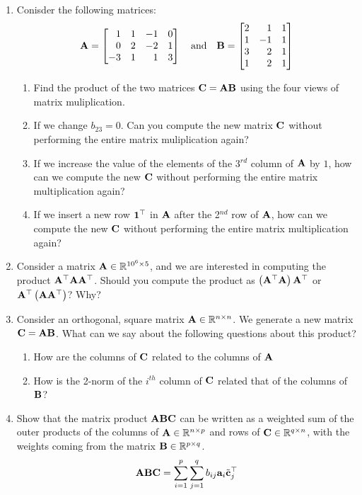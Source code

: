 \documentclass[
10pt, %
a4paper, %
oneside, %
headinclude,footinclude, %
BCOR5mm, %
]{scrartcl}
\def\mf{\ensuremath\mathbf}
\def\mb{\ensuremath\mathbb}
\def\lp{\ensuremath\left(}
\def\rp{\ensuremath\right)}
\def\bmx{\ensuremath\begin{bmatrix*}[r]}
\def\emx{\ensuremath\end{bmatrix*}}
\begin{document}
\begin{enumerate}
	\item Conisder the following matrices:
	\[ \mf{A} = \bmx 1 & 1 & -1 & 0 \\
	0 & 2 & -2 & 1 \\
	-3 & 1 & 1 & 3
	\emx \quad \text{and} \quad \mf{B} = \bmx 2 & 1 & 1 \\
	1 & -1 & 1 \\
	3 & 2 & 1 \\
	1 & 2 & 1
	\emx \]
	\begin{enumerate}
		\item Find the product of the two matrices $\mf{C} = \mf{A}\mf{B}$ using the four views of matrix muliplication.

		\item If we change $b_{23} = 0$. Can you compute the new matrix $\mf{C}$ without performing the entire matrix muliplication again?
	
		\item If we increase the value of the elements of the 3$^{rd}$ column of $\mf{A}$ by $1$, how can we compute the new $\mf{C}$ without performing the entire matrix multiplication again?
	
		\item If we insert a new row $\mf{1}^\top$ in $\mf{A}$ after the 2$^{nd}$ row of $\mf{A}$, how can we compute the new $\mf{C}$ without performing the entire matrix multiplication again?
	\end{enumerate}
	
	\item Consider a matrix $\mf{A} \in \mb{R}^{10^6 \times 5}$, and we are interested in computing the product $\mf{A}^\top\mf{A}\mf{A}^\top$. Should you compute the product as $\lp \mf{A}^\top\mf{A} \rp\mf{A}^\top$ or $\mf{A}^\top\lp \mf{A}\mf{A}^\top \rp$? Why?
	
	\item Consider an orthogonal, square matrix $\mf{A} \in \mb{R}^{n \times n}$. We generate a new matrix $\mf{C} = \mf{A}\mf{B}$. What can we say about the following questions about this product?
	\begin{enumerate}
		\item How are the columns of $\mf{C}$ related to the columns of $\mf{A}$
		\item How is the 2-norm of the $i^{th}$ column of $\mf{C}$ related that of the columns of $\mf{B}$? 
	\end{enumerate}

	\item Show that the matrix product $\mf{A}\mf{B}\mf{C}$ can be written as a weighted sum  of the outer products of the columns of $\mf{A} \in \mb{R}^{n \times p}$ and rows of $\mf{C} \in \mb{R}^{q \times n}$, with the weights coming from the matrix $\mf{B} \in \mb{R}^{p \times q}$.
	\[ \mf{A}\mf{B}\mf{C} = \sum_{i=1}^p \sum_{j=1}^q b_{ij} \mf{a}_i \tilde{\mf{c}}_j^\top \]


\end{enumerate}
\end{document}
